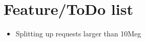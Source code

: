 \section{Feature/ToDo list}
\begin{itemize}
  \item Splitting up requests larger than 10Meg
\end{itemize}